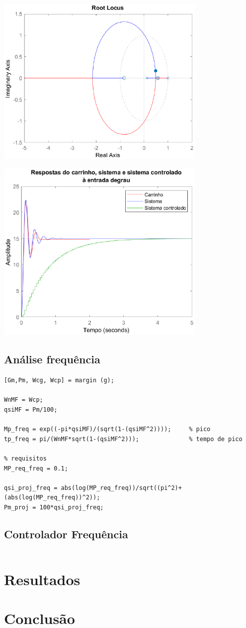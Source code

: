 \documentclass{article}
\begin{document}
\includegraphics [width=4in]{images/Matlab/identifica_07.eps}

\includegraphics [width=4in]{images/Matlab/identifica_08.eps}


\subsection*{Análise frequência}

\begin{lstlisting}
[Gm,Pm, Wcg, Wcp] = margin (g);

WnMF = Wcp;
qsiMF = Pm/100;

Mp_freq = exp((-pi*qsiMF)/(sqrt(1-(qsiMF^2))));     % pico
tp_freq = pi/(WnMF*sqrt(1-(qsiMF^2)));              % tempo de pico

% requisitos
MP_req_freq = 0.1;

qsi_proj_freq = abs(log(MP_req_freq))/sqrt((pi^2)+(abs(log(MP_req_freq))^2));
Pm_proj = 100*qsi_proj_freq;
\end{lstlisting}

\subsection*{Controlador Frequência}

\begin{lstlisting}

\end{lstlisting}




\section{Resultados}




\section{Conclusão}
\end{document}
